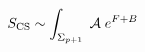 \begin{equation}
S_{\rm CS}\sim \int_{\Sigma_{p + 1}}\;{\cal A} \;e^{F + B}
\label{eq:Chern-Simons}
\end{equation}

